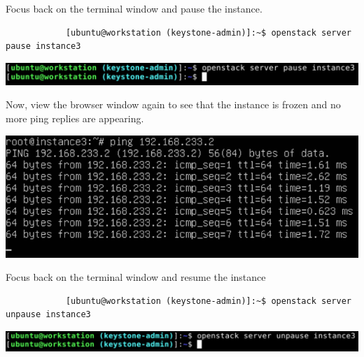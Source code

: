 \documentclass[letterpaper, 12pt]{article}
\begin{document}
\begin{enumerate}
    \begin{labstep}
        Focus back on the terminal window and pause the instance.
        \begin{lstlisting}
            [ubuntu@workstation (keystone-admin)]:~$ openstack server pause instance3
        \end{lstlisting}

        \begin{center}
            \includegraphics[width=\linewidth]{images/part4/step5.png}
        \end{center}
    \end{labstep}

    \begin{labstep}
        Now, view the browser window again to see that the instance is frozen and no more ping replies are appearing.

        \begin{center}
            \includegraphics[width=\linewidth]{images/part4/step6.png}
        \end{center}
    \end{labstep}

    \begin{labstep}
        Focus back on the terminal window and resume the instance
        \begin{lstlisting}
            [ubuntu@workstation (keystone-admin)]:~$ openstack server unpause instance3
        \end{lstlisting}

        \begin{center}
            \includegraphics[width=\linewidth]{images/part4/step7.png}
        \end{center}
    \end{labstep}


\end{enumerate}
\end{document}
